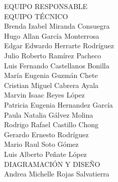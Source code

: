 {\Bold \LARGE \color{color3} EQUIPO RESPONSABLE}\\[2cm]
{\Bold \large \color{color2} EQUIPO TÉCNICO}\\[0.2cm]
Brenda Izabel Miranda Consuegra\\
Hugo Allan García Monterrosa\\
Edgar Edwardo Herrarte Rodríguez\\
Julio Roberto Ramírez Pacheco \\
Luis Fernando Castellanos Bonilla \\
María Eugenia Guzmán Chete\\
Cristian Miguel Cabrera Ayala\\
Marvin Isaac Reyes López\\
Patricia Eugenia Hernandez García\\
Paula Natalia Gálvez Molina\\
Rodrigo Rafael Castillo Chong\\
Gerardo Ernesto Rodríguez\\
Mario Raul Soto Gómez\\
Luis Alberto Peñate López\\[0.8cm]
{\Bold \large \color{color2} DIAGRAMACIÓN Y DISEÑO}\\[0.2cm]
Andrea Michelle Rojas Salvatierra\\[0.8cm]
